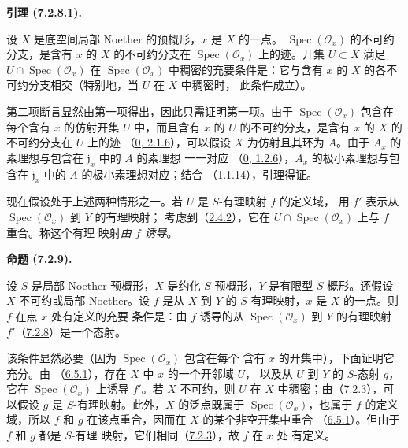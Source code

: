 \documentclass[UTF8,fontset=none,11pt,oneside,openany]{ctexbook}
\newenvironment{lemma}[1][]{%
  \par\medskip\noindent\textbf{引理 (#1).}\ %
}{\par}
\newenvironment{proposition}[1][]{%
  \par\medskip\noindent\textbf{命题 (#1).}\ %
}{\par}
\newcommand{\oldpage}[2][]{%
  \hypertarget{ega-source-page-#1-#2}{}%
  \marginnote{\scriptsize\textbf{#1}~|~#2}\ignorespaces}
\let\EGAOriginalLabel\label
\renewcommand{\label}[1]{\phantomsection\EGAOriginalLabel{#1}}
\begin{document}
\begin{lemma}[7.2.8.1]
\label{I.7.2.8.1-fr}
设 $X$ 是底空间局部 Noether 的预概形，$x$ 是 $X$ 的一点。
$\operatorname{Spec}(\mathscr{O}_x)$ 的不可约分支，是含有 $x$ 的 $X$
的不可约分支在 $\operatorname{Spec}(\mathscr{O}_x)$ 上的迹。开集
$U\subset X$ 满足 $U\cap\operatorname{Spec}(\mathscr{O}_x)$ 在
$\operatorname{Spec}(\mathscr{O}_x)$ 中稠密的充要条件是：它与含有
$x$ 的 $X$ 的各不可约分支相交（特别地，当 $U$ 在 $X$ 中稠密时，
此条件成立）。
\end{lemma}

第二项断言显然由第一项得出，因此只需证明第一项。由于
$\operatorname{Spec}(\mathscr{O}_x)$ 包含在每个含有 $x$ 的仿射开集
$U$ 中，而且含有 $x$ 的 $U$ 的不可约分支，是含有 $x$ 的 $X$ 的
不可约分支在 $U$ 上的迹
（\hyperref[0.2.1.6-fr]{0, 2.1.6}），可以假设 $X$ 为仿射且其环为
$A$。由于 $A_x$ 的素理想与包含在 $\mathfrak{j}_x$ 中的 $A$ 的素理想
一一对应
\oldpage[I]{161}
（\hyperref[0.1.2.6-fr]{0, 1.2.6}），$A_x$ 的极小素理想与包含在
$\mathfrak{j}_x$ 中的 $A$ 的极小素理想对应；结合
（\hyperref[I.1.1.14-fr]{1.1.14}），引理得证。

现在假设处于上述两种情形之一。若 $U$ 是 $S$-有理映射 $f$ 的定义域，
用 $f'$ 表示从 $\operatorname{Spec}(\mathscr{O}_x)$ 到 $Y$ 的有理映射；
考虑到（\hyperref[I.2.4.2-fr]{2.4.2}），它在
$U\cap\operatorname{Spec}(\mathscr{O}_x)$ 上与 $f$ 重合。称这个有理
映射\emph{由 $f$ 诱导}。

\begin{proposition}[7.2.9]
\label{I.7.2.9-fr}
设 $S$ 是局部 Noether 预概形，$X$ 是约化 $S$-预概形，$Y$ 是有限型
$S$-概形。还假设 $X$ 不可约或局部 Noether。设 $f$ 是从 $X$ 到 $Y$
的 $S$-有理映射，$x$ 是 $X$ 的一点。则 $f$ 在点 $x$ 处有定义的充要
条件是：由 $f$ 诱导的从 $\operatorname{Spec}(\mathscr{O}_x)$ 到 $Y$
的有理映射 $f'$（\hyperref[I.7.2.8-fr]{7.2.8}）是一个态射。
\end{proposition}

该条件显然必要（因为 $\operatorname{Spec}(\mathscr{O}_x)$ 包含在每个
含有 $x$ 的开集中），下面证明它充分。由
（\hyperref[I.6.5.1-fr]{6.5.1}），存在 $X$ 中 $x$ 的一个开邻域 $U$，
以及从 $U$ 到 $Y$ 的 $S$-态射 $g$，它在
$\operatorname{Spec}(\mathscr{O}_x)$ 上诱导 $f'$。若 $X$ 不可约，则
$U$ 在 $X$ 中稠密；由（\hyperref[I.7.2.3-fr]{7.2.3}），可以假设 $g$
是 $S$-有理映射。此外，$X$ 的泛点既属于
$\operatorname{Spec}(\mathscr{O}_x)$，也属于 $f$ 的定义域，所以 $f$
和 $g$ 在该点重合，因而在 $X$ 的某个非空开集中重合
（\hyperref[I.6.5.1-fr]{6.5.1}）。但由于 $f$ 和 $g$ 都是 $S$-有理
映射，它们相同（\hyperref[I.7.2.3-fr]{7.2.3}），故 $f$ 在 $x$ 处
有定义。
\end{document}
